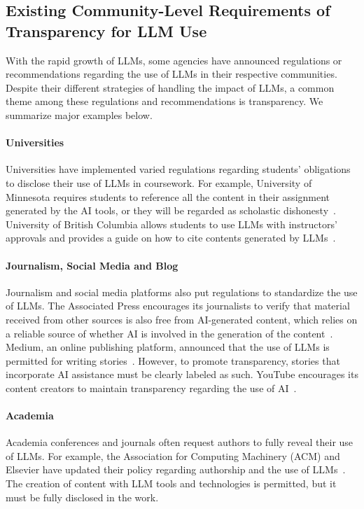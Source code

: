\subsection{Existing Community-Level Requirements of Transparency for LLM Use}
\label{sec:community-level-requirements-of-transparency}
With the rapid growth of LLMs, some agencies have announced regulations or recommendations regarding the use of LLMs in their respective communities. 
Despite their different strategies of handling the impact of LLMs, a common theme among these regulations and recommendations is transparency.
We summarize major examples below.

\paragraph{Universities} 
Universities have implemented varied regulations regarding students' obligations to disclose their use of LLMs in coursework.
For example, University of Minnesota requires students to reference all the content in their assignment generated by the AI tools, or they will be regarded as scholastic dishonesty~\cite{UMNLib2024LibGuide}.
University of British Columbia allows students to use LLMs with instructors' approvals and provides a guide on how to cite contents generated by LLMs~\cite{UBCLibrary2024CitingGenAI}. 


\paragraph{Journalism, Social Media and Blog} 
Journalism and social media platforms also put regulations to standardize the use of LLMs.
The Associated Press encourages its journalists to verify that material received from other sources is also free from AI-generated content, which relies on a reliable source of whether AI is involved in the generation of the content~\cite{AP2024ChatGPTStance}.
Medium, an online publishing platform, announced that the use of LLMs is permitted for writing stories~\cite{Medium2024DistStandards}.
However, to promote transparency, stories that incorporate AI assistance must be clearly labeled as such.
YouTube encourages its content creators to maintain transparency regarding the use of AI~\cite{YouTube2024ResponsibleAI}.


\paragraph{Academia}
Academia conferences and journals often request authors to fully reveal their use of LLMs. 
For example, the Association for Computing Machinery (ACM) and Elsevier have updated their policy regarding authorship and the use of LLMs~\cite{ACM2023AuthorshipPolicy, Elsevier2024AIWritingPolicy}.
The creation of content with LLM tools and technologies is permitted, but it must be fully disclosed in the work.


